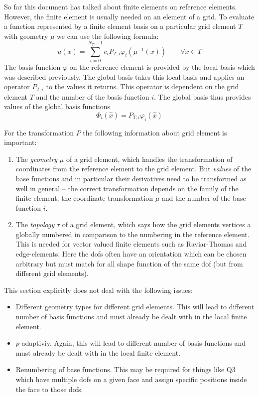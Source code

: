 \documentclass[a4paper,11pt]{article}
\begin{document}
So far this document has talked about finite elements on reference elements.
However, the finite element is usually needed on an element of a grid.  To
evaluate a function represented by a finite element basis on a particular grid
element $T$ with geometry $\mu$ we can use the following formula:
\begin{equation}
  u(x)=\sum_{i=0}^{N_T-1}c_iP_{T,i}\varphi_i(\mu^{-1}(x)) \qquad\forall x\in T
\end{equation}
The basis function $\varphi$ on the reference element is provided by the local
basis which was described previously.  The global basis takes this local basis
and applies an operator $P_{T,i}$ to the values it returns.  This operator is
dependent on the grid element $T$ and the number of the basis function $i$.
The global basis thus provides values of the global basis functions
\begin{equation}
  \Phi_i(\hat x)=P_{T,i}\varphi_i(\hat x)
\end{equation}

For the transformation $P$ the following information about grid element is
important:
\begin{enumerate}
\item The {\em geometry} $\mu$ of a grid element, which handles the
  transformation of coordinates from the reference element to the grid
  element.  But {\em values} of the base functions and in particular their
  derivatives need to be transformed as well in general -- the correct
  transformation depends on the family of the finite element, the coordinate
  transformation $\mu$ and the number of the base function $i$.
\item The {\em topology} $\tau$ of a grid element, which says how the grid
  elements vertices a globally numbered in comparison to the numbering in the
  reference element.  This is needed for vector valued finite elements such as
  Raviar-Thomas and edge-elements.  Here the dofs often have an orientation
  which can be chosen arbitrary but must match for all shape function of the
  same dof (but from different grid elements).
\end{enumerate}

This section explicitly does not deal with the following issues:
\begin{itemize}
\item Different geometry types for different grid elements.  This will lead to
  different number of basis functions and must already be dealt with in the
  local finite element.
\item $p$-adaptiviy.  Again, this will lead to different number of basis
  functions and must already be dealt with in the local finite element.
\item Renumbering of base functions.  This may be required for things like Q3
  which have multiple dofs on a given face and assign specific positions
  inside the face to those dofs.
\end{itemize}
\end{document}
